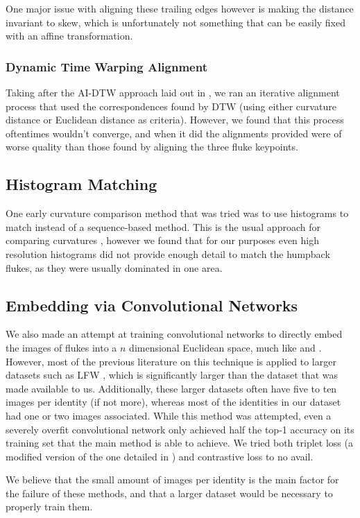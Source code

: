 One major issue with aligning these trailing edges however is making the distance invariant to skew, which is unfortunately not something that can be easily fixed with an affine transformation.

\subsubsection{Dynamic Time Warping Alignment}

Taking after the AI-DTW approach laid out in \cite{qiao2006affine}, we ran an iterative alignment process that used the correspondences found by DTW (using either curvature distance or Euclidean distance as criteria).
However, we found that this process oftentimes wouldn't converge, and when it did the alignments provided were of worse quality than those found by aligning the three fluke keypoints.

\subsection{Histogram Matching}

One early curvature comparison method that was tried was to use histograms to match instead of a sequence-based method.
This is the usual approach for comparing curvatures \cite{kumar2012leafsnap}, %
however we found that for our purposes even high resolution histograms did not provide enough detail to match the humpback flukes, as they were usually dominated in one area.

\subsection{Embedding via Convolutional Networks}

We also made an attempt at training convolutional networks to directly embed the images of flukes into a $n$ dimensional Euclidean space, much like \cite{schroff2015facenet} and \cite{parkhi2015deep}.
However, most of the previous literature on this technique is applied to larger datasets such as LFW %
, which is significantly larger than the dataset that was made available to us.
Additionally, these larger datasets often have five to ten images per identity (if not more), whereas most of the identities in our dataset had one or two images associated.
While this method was attempted, even a severely overfit convolutional network only achieved half the top-1 accuracy on its training set that the main method is able to achieve.
We tried both triplet loss (a modified version of the one detailed in \cite{schroff2015facenet}) and contrastive loss %
to no avail.

We believe that the small amount of images per identity is the main factor for the failure of these methods, and that a larger dataset would be necessary to properly train them.

